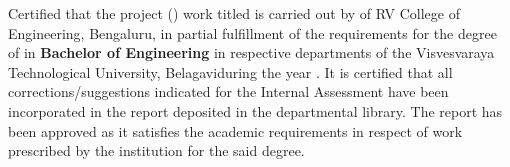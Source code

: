 \begin{spacing}{1.5}
	\noindent Certified that the \else {} \else {}\fi\fi\fi project (\printCode) work titled \textbf{\textit{\printTitle}} is carried out by
	\fi of RV College of Engineering, Bengaluru, in partial fulfillment of the requirements for the degree of \ifPG \textbf{\printMastersInLF} in \textbf{\printMastersPrgName} \else\textbf{Bachelor of Engineering} in \ifIDP respective departments \else \textbf{\printDepartmentLF} \fi\fi \ifIDP \else of the Visvesvaraya Technological University, Belagavi\space\fi during the year \printAcadYear. It is certified that all corrections/suggestions indicated for the Internal Assessment have been incorporated in the \else{}\else{}\fi\fi\fi report deposited in the departmental library. The  \else {} \else {}\fi\fi\fi report has been approved as it satisfies the academic requirements in respect of  \else{}\else{}\fi\fi\fi work prescribed by the institution for the said degree. \par
\end{spacing}
